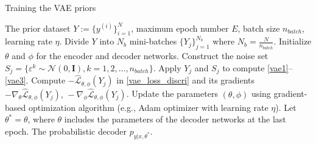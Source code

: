 \begin{algorithm}[H]
	\caption{Training the VAE priors}
	\label{alg_vae_gan}
	\begin{algorithmic}[1]
		\Require The prior dataset $Y:=\{y^{(i)}\}_{i=1}^N$, maximum epoch number $E$, batch size $n_{batch}$, learning rate $\eta$.
           \State Divide $Y$ into $N_b$ mini-batches $\{Y_j\}_{j=1}^{N_b}$ where $N_b=\frac{N}{n_{batch}}$.
           \State Initialize $\theta$ and $\phi$ for the encoder and decoder networks.		
            \State Construct the noise set $S_j=\{\varepsilon^k\sim \mathcal{N}(0,\mathbf{I}),k=1,2,\dots,n_{batch}\}$.
            \State Apply $Y_j$ and $S_j$ to compute  \eqref{vae1}--\eqref{vae3}.
		\State Compute  $-\hat{\mathcal{L}}_{\theta,\phi}(Y_j)$ in  \eqref{vae_loss_discri} and its gradients $-\nabla_{\theta}\hat{\mathcal{L}}_{\theta,\phi}(Y_j),\,-\nabla_{\phi}\hat{\mathcal{L}}_{\theta,\phi}(Y_j)$.
		\State Update the parameters $(\theta,\phi)$ using gradient-based optimization algorithm (e.g., Adam optimizer \cite{kingma2014adam} with learning rate $\eta$).
		\EndFor
		\EndFor
         \State Let $\theta^*=\theta$, where $\theta$ includes the parameters of the decoder networks at the last epoch.
		\Ensure The probabilistic decoder $p_{y|x,\theta^*}$.
	\end{algorithmic}
\end{algorithm}

